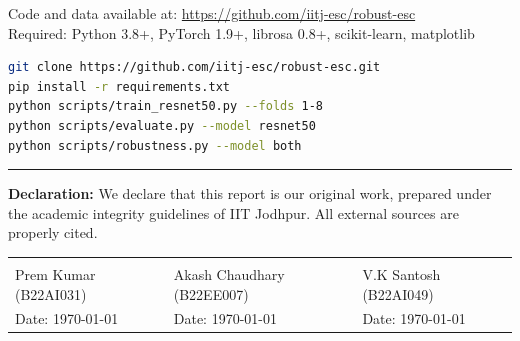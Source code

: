 \documentclass[11pt,a4paper]{article}
\begin{document}
Code and data available at: \url{https://github.com/iitj-esc/robust-esc}\\
Required: Python 3.8+, PyTorch 1.9+, librosa 0.8+, scikit-learn, matplotlib

\begin{lstlisting}[language=bash]
git clone https://github.com/iitj-esc/robust-esc.git
pip install -r requirements.txt
python scripts/train_resnet50.py --folds 1-8
python scripts/evaluate.py --model resnet50
python scripts/robustness.py --model both
\end{lstlisting}

\vspace{10pt}
\noindent\rule{\textwidth}{0.4pt}

\vspace{6pt}
\textbf{Declaration:} We declare that this report is our original work, prepared under the academic integrity guidelines of IIT Jodhpur. All external sources are properly cited.

\vspace{12pt}

\begin{tabular}{p{4.5cm}p{4.5cm}p{4cm}}
\underline{\hspace{3.8cm}} & \underline{\hspace{3.8cm}} & \underline{\hspace{3.8cm}} \\
Prem Kumar (B22AI031) & Akash Chaudhary (B22EE007) & V.K Santosh (B22AI049) \\
Date: \today & Date: \today & Date: \today \\
\end{tabular}
\end{document}
